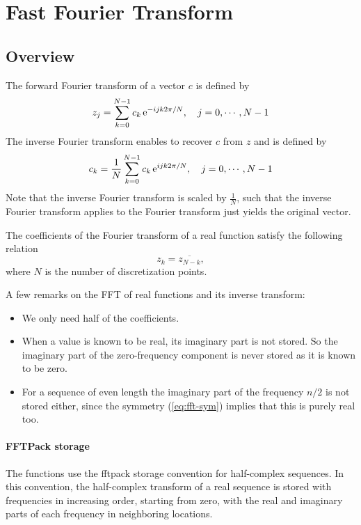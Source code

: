 \section{Fast Fourier Transform}
\subsection{Overview}

The forward Fourier transform of a vector $c$ is defined by
\begin{equation*}
  z_j = \sum_{k=0}^{N-1} c_k \operatorname{e}^{ -i j k 2 \pi / N }, \quad j=0,\cdots,N-1
\end{equation*}
The inverse Fourier transform enables to recover $c$ from $z$ and is defined by
\begin{equation*}
  c_k = \frac{1}{N}\sum_{k=0}^{N-1} c_k \operatorname{e}^{ i j k 2 \pi / N }, \quad j=0,\cdots,N-1
\end{equation*}
Note that the inverse Fourier transform is scaled by $\frac{1}{N}$, such that the inverse Fourier transform applies to the Fourier transform just yields the original vector.


The coefficients of the Fourier transform of a real function satisfy the
following relation
\begin{equation}
  \label{eq:fft-sym}
  z_k = \overline{z_{N-k}},
\end{equation}
where $N$ is the number of discretization points.

A few remarks on the FFT of real functions and its inverse transform:
\begin{itemize}
\item We only need half of the coefficients.
\item When a value is known to be real, its imaginary part is not stored.
  So the imaginary part of the zero-frequency component is never stored as it is
  known to be zero.
\item For a sequence of even length the imaginary part of the frequency
  $n/2$ is not stored either, since the symmetry (\ref{eq:fft-sym}) implies
  that this is purely real too.
\end{itemize}


\paragraph{FFTPack storage}
\label{sec:fftpack-storage}

The functions use the fftpack storage convention for half-complex sequences.
In this convention, the half-complex transform of a real sequence is stored
with frequencies in increasing order, starting from zero, with the real and
imaginary parts of each frequency in neighboring locations.

